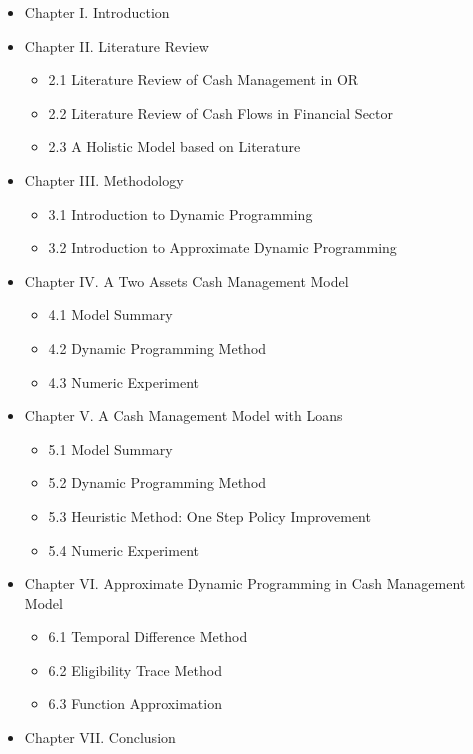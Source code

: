 \documentclass[12pt]{article}
\begin{document}
\begin{itemize}
\item Chapter I.	Introduction
\item Chapter II. Literature Review
\begin{itemize}
\item  2.1 Literature Review of Cash Management in OR
\item  2.2 Literature Review of  Cash Flows in Financial Sector
\item 2.3 A Holistic Model based on Literature
\end{itemize}
\item Chapter III. Methodology
\begin{itemize}
\item  3.1 Introduction to Dynamic Programming
\item  3.2 Introduction to Approximate Dynamic Programming
\end{itemize}
\item Chapter IV. A Two Assets Cash Management Model
\begin{itemize}
\item  4.1 Model Summary
\item  4.2 Dynamic Programming Method
\item 4.3 Numeric Experiment
\end{itemize}

\item Chapter V. A Cash Management Model with Loans
\begin{itemize}
\item  5.1 Model Summary
\item  5.2 Dynamic Programming Method
\item  5.3 Heuristic Method: One Step Policy Improvement
\item  5.4 Numeric Experiment
\end{itemize}

\item Chapter VI. Approximate Dynamic Programming in Cash Management Model
\begin{itemize}
\item  6.1 Temporal Difference Method
\item  6.2 Eligibility Trace Method
\item  6.3 Function Approximation
\end{itemize}
\item Chapter VII. Conclusion
\end{itemize}
\end{document}
